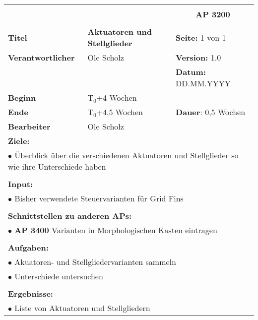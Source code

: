 \clearpage
\begin{table}[!h]
	\begin{center}
		\begin{tabular}{|p{35mm}||p{55mm}|p{50mm}||p{40mm}|}
			\hline
			\multicolumn{3}{|l||}{\textbf{}} & \multicolumn{1}{c|}{}\\
			\multicolumn{3}{|l||}{\textbf{}} & \multicolumn{1}{c|}{\textbf{AP 3200}}\\
			\multicolumn{3}{|l||}{\textbf{}} & \multicolumn{1}{c|}{}\\
			\hline\hline
			\textbf{Titel} & \multicolumn{2}{p{7cm}||}{\textbf{Aktuatoren und Stellglieder}} 
			& \textbf{Seite:} 1 von 1\\
			\hline
			\textbf{Verantwortlicher} & \multicolumn{2}{l||}{Ole Scholz} & \textbf{Version:} 1.0\\
			\hline
			\multicolumn{3}{|l||}{} & \textbf{Datum:} DD.MM.YYYY\\
			\hline\hline
			\textbf{Beginn} & \multicolumn{2}{l||}{T$_0$+4 Wochen} & \\
			\hline
			\textbf{Ende} & \multicolumn{2}{l||}{T$_0$+4,5 Wochen} & \textbf{Dauer}: 0,5 Wochen\\
			\hline\hline
			\textbf{Bearbeiter} & \multicolumn{3}{l|}{Ole Scholz}\\
			\hline\hline
			\multicolumn{4}{|p{150mm}|}{\textbf{Ziele:}}\\
			\multicolumn{4}{|p{150mm}|}{$\bullet$ Überblick über die verschiedenen Aktuatoren und Stellglieder so wie ihre Unterschiede haben}\\
			\multicolumn{4}{|p{150mm}|}{}\\
			\multicolumn{4}{|p{150mm}|}{\textbf{Input:}}\\
			\multicolumn{4}{|p{150mm}|}{$\bullet$ Bisher verwendete Steuervarianten für Grid Fins}\\
			\multicolumn{4}{|p{150mm}|}{}\\
			\multicolumn{4}{|p{150mm}|}{\textbf{Schnittstellen zu anderen APs:}}\\
			\multicolumn{4}{|p{150mm}|}{$\bullet$ \textbf{AP 3400} Varianten in Morphologischen Kasten eintragen}\\
			\multicolumn{4}{|p{150mm}|}{}\\
			\multicolumn{4}{|p{150mm}|}{\textbf{Aufgaben:}}\\
			\multicolumn{4}{|p{150mm}|}{$\bullet$ Akuatoren- und Stellgliedervarianten sammeln}\\
			\multicolumn{4}{|p{150mm}|}{$\bullet$ Unterschiede untersuchen}\\
			\multicolumn{4}{|p{150mm}|}{}\\
			\multicolumn{4}{|p{150mm}|}{\textbf{Ergebnisse:}}\\
			\multicolumn{4}{|p{150mm}|}{$\bullet$ Liste von Aktuatoren und Stellgliedern}\\
			\hline
		\end{tabular}
	\end{center}
\end{table}

